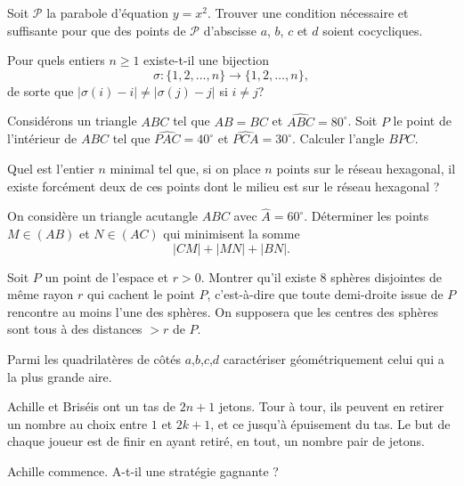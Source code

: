 \begin{exo}{ }
Soit $\mathcal{P}$ la parabole d'équation $y=x^2$. Trouver une condition nécessaire et suffisante pour que des points de $\mathcal{P}$ d'abscisse $a$, $b$, $c$ et $d$ soient cocycliques.
\end{exo}

\begin{exo}{}
Pour quels entiers $n \geq 1$ existe-t-il une bijection
\[\sigma : \{ 1,2, \ldots,n\} \rightarrow \{ 1,2, \ldots,n\},\]
de sorte que $\vert \sigma(i)-i \vert \neq \vert \sigma(j)-j \vert$ si $i \neq j$?
\end{exo}

\begin{exo}{}
Consid\'erons un triangle $ABC$ tel que $AB=BC$ et $\widehat{ABC} = 80^\circ$. Soit $P$ le point de l'int\'erieur de $ABC$ tel que $\widehat{PAC} = 40^\circ$ et $\widehat{PCA} = 30^\circ$. Calculer l'angle $\widehat{BPC}$.
\end{exo}

\begin{exo}{ }
Quel est l'entier $n$ minimal tel que, si on place $n$ points sur le
réseau hexagonal, il existe forcément deux de ces points dont le milieu est sur
le réseau hexagonal ?
\end{exo}

\begin{exo}{}
On considère un triangle acutangle $ABC$ avec $\widehat{A}=60^\circ$. Déterminer les points $M\in (AB)$ et $N\in (AC)$ qui minimisent la somme
\[|CM|+|MN|+|BN|.\]
\end{exo}

\begin{exo}{}
Soit $P$ un point de l'espace
et $r>0$. Montrer qu'il existe $8$ sphères disjointes de même rayon
$r$ qui cachent le point $P$, c'est-à-dire que toute demi-droite
issue de $P$ rencontre au moins l'une des sphères. On supposera que
les centres des sphères sont tous à des distances $>r$ de $P$.

\end{exo}

\begin{exo}{}
Parmi les quadrilatères de côtés
$a$,$b$,$c$,$d$ caractériser géométriquement celui qui a la plus
grande aire.
\end{exo}

\begin{exo}{ }
Achille et Briséis ont un tas de $2n+1$ jetons. Tour à tour, ils peuvent en retirer un nombre au choix entre $1$ et $2k+1$, et ce jusqu'à épuisement du tas. Le but de chaque joueur est de finir en ayant retiré, en tout, 
un nombre pair de jetons.

Achille commence. A-t-il une stratégie gagnante ?
\end{exo}

